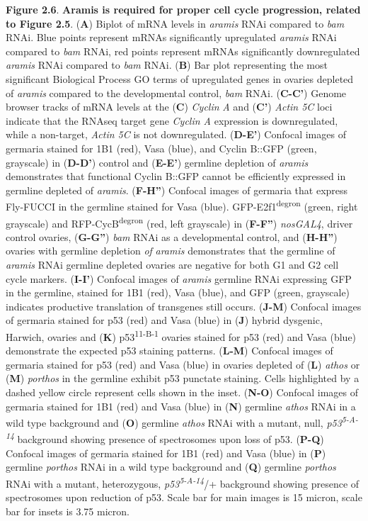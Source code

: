 \documentclass[12pt,oneside]{reedthesis}
\begin{document}
\textbf{Figure 2.6}. \textbf{Aramis is required for proper cell cycle
progression, related to Figure 2.5}. (\textbf{A}) Biplot of mRNA levels in
\emph{aramis} RNAi compared to \emph{bam} RNAi. Blue points represent mRNAs
significantly upregulated \emph{aramis} RNAi compared to \emph{bam} RNAi, red
points represent mRNAs significantly downregulated \emph{aramis} RNAi
compared to \emph{bam} RNAi. (\textbf{B}) Bar plot representing the most
significant Biological Process GO terms of upregulated genes in ovaries
depleted of \emph{aramis} compared to the developmental control, \emph{bam} RNAi.
(\textbf{C-C'}) Genome browser tracks of mRNA levels at the (\textbf{C}) \emph{Cyclin}
\emph{A} and (\textbf{C'}) \emph{Actin 5C} loci indicate that the RNAseq target gene
\emph{Cyclin A} expression is downregulated, while a non-target, \emph{Actin 5C}
is not downregulated. (\textbf{D-E'}) Confocal images of germaria stained for
1B1 (red), Vasa (blue), and Cyclin B::GFP (green, grayscale) in
(\textbf{D-D'}) control and (\textbf{E-E'}) germline depletion of \emph{aramis}
demonstrates that functional Cyclin B::GFP cannot be efficiently
expressed in germline depleted of \emph{aramis}. (\textbf{F-H''}) Confocal images
of germaria that express Fly-FUCCI in the germline stained for Vasa
(blue). GFP-E2f1\textsuperscript{degron} (green, right grayscale) and RFP-CycB\textsuperscript{degron}
(red, left grayscale) in (\textbf{F-F''}) \emph{nosGAL4}, driver control ovaries,
(\textbf{G-G''}) \emph{bam} RNAi as a developmental control, and (\textbf{H-H''})
ovaries with germline depletion \emph{of} \emph{aramis} demonstrates that the
germline of \emph{aramis} RNAi germline depleted ovaries are negative for
both G1 and G2 cell cycle markers. (\textbf{I-I'}) Confocal images of
\emph{aramis} germline RNAi expressing GFP in the germline, stained for 1B1
(red), Vasa (blue), and GFP (green, grayscale) indicates productive
translation of transgenes still occurs. (\textbf{J-M}) Confocal images of
germaria stained for p53 (red) and Vasa (blue) in (\textbf{J}) hybrid
dysgenic, Harwich, ovaries and (\textbf{K}) p53\textsuperscript{11-B-1} ovaries stained for
p53 (red) and Vasa (blue) demonstrate the expected p53 staining
patterns. (\textbf{L-M}) Confocal images of germaria stained for p53 (red)
and Vasa (blue) in ovaries depleted of (\textbf{L}) \emph{athos} or (\textbf{M})
\emph{porthos} in the germline exhibit p53 punctate staining. Cells
highlighted by a dashed yellow circle represent cells shown in the
inset. (\textbf{N-O}) Confocal images of germaria stained for 1B1 (red) and
Vasa (blue) in (\textbf{N}) germline \emph{athos} RNAi in a wild type background
and (\textbf{O}) germline \emph{athos} RNAi with a mutant, null, \emph{p53\textsuperscript{5-A-14}}
background showing presence of spectrosomes upon loss of p53. (\textbf{P-Q})
Confocal images of germaria stained for 1B1 (red) and Vasa (blue) in
(\textbf{P}) germline \emph{porthos} RNAi in a wild type background and (\textbf{Q})
germline \emph{porthos} RNAi with a mutant, heterozygous, \emph{p53\textsuperscript{5-A-14}}/+
background showing presence of spectrosomes upon reduction of p53. Scale
bar for main images is 15 micron, scale bar for insets is 3.75 micron.
\end{document}
